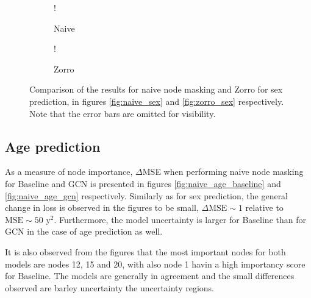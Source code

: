 \begin{figure}[H]
    \centering
        \begin{subfigure}{.5\textwidth}
            \centering
            \begin{center}
                \resizebox {1.0\linewidth} {!} {
                    
                }
            \end{center}
            \caption{Naive}
            \label{fig:comparison_sex_naive}
        \end{subfigure}%
        \begin{subfigure}{.5\textwidth}
            \centering
            \begin{center}
                \resizebox {1.0\linewidth} {!} {
                    
                }
            \end{center}
            \caption{Zorro}
            \label{fig:comparison_sex_zorro}
        \end{subfigure}
    \caption{Comparison of the results for naive node masking and Zorro for sex prediction, in figures \ref{fig:naive_sex} and \ref{fig:zorro_sex} respectively. Note that the error bars are omitted for visibility.}
    \label{fig:comparison_sex}
\end{figure}



\subsection{Age prediction}
As a measure of node importance, $\Delta$MSE when performing naive node masking for Baseline and GCN is presented in figures \ref{fig:naive_age_baseline} and \ref{fig:naive_age_gcn} respectively. Similarly as for sex prediction, the general change in loss is observed in the figures to be small, $\Delta\text{MSE}\sim1$ relative to $\text{MSE}\sim50\text{ y}^2$. Furthermore, the model uncertainty is larger for Baseline than for GCN in the case of age prediction as well. 

It is also observed from the figures that the most important nodes for both models are nodes 12, 15 and 20, with also node 1 havin a high importancy score for Baseline. The models are generally in agreement and the small differences observed are barley uncertainty the uncertainty regions. 




